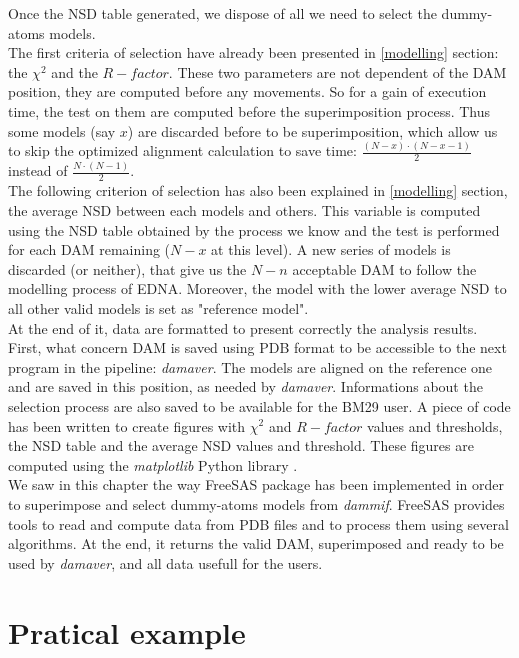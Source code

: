 \documentclass[a4paper, 11pt]{report}
\begin{document}
Once the NSD table generated, we dispose of all we need to select the 
dummy-atoms models.\\
The first criteria of selection have already been presented in 
\ref{modelling} section: the $\chi^2$ and the $R-factor$. 
These two parameters are not dependent of the DAM position, they are 
computed before any movements. 
So for a gain of execution time, the test on them are computed before 
the superimposition process. 
Thus some models (say $x$) are discarded before to be superimposition, 
which allow us to skip the optimized alignment calculation to save 
time: $\frac{(N-x) \cdot (N-x-1)}{2}$ instead of 
$\frac{N \cdot (N-1)}{2}$.\\
The following criterion of selection has also been explained in 
\ref{modelling} section, the average NSD between each models and 
others. 
This variable is computed using the NSD table obtained by the process 
we know and the test is performed for each DAM remaining ($N-x$ at 
this level). 
A new series of models is discarded (or neither), that give us the 
$N-n$ acceptable DAM to follow the modelling process of EDNA. 
Moreover, the model with the lower average NSD to all other valid 
models is set as "reference model".\\

At the end of it, data are formatted to present correctly the analysis 
results. 
First, what concern DAM is saved using PDB format to be accessible to 
the next program in the pipeline: \textit{damaver}. 
The models are aligned on the reference one and are saved in this 
position, as needed by \textit{damaver}. 
Informations about the selection process are also saved to be 
available for the BM29 user. 
A piece of code has been written to create figures with $\chi^2$ and 
$R-factor$ values and thresholds, the NSD table and the average NSD 
values and threshold. 
These figures are computed using the \textit{matplotlib} Python 
library \cite{matplotlib}.\\

We saw in this chapter the way FreeSAS package has been implemented in 
order to superimpose and select dummy-atoms models from 
\textit{dammif}. 
FreeSAS provides tools to read and compute data from PDB files and to 
process them using several algorithms. 
At the end, it returns the valid DAM, superimposed and ready to be 
used by \textit{damaver}, and all data usefull for the users.


\chapter{Pratical example}%
\end{document}

